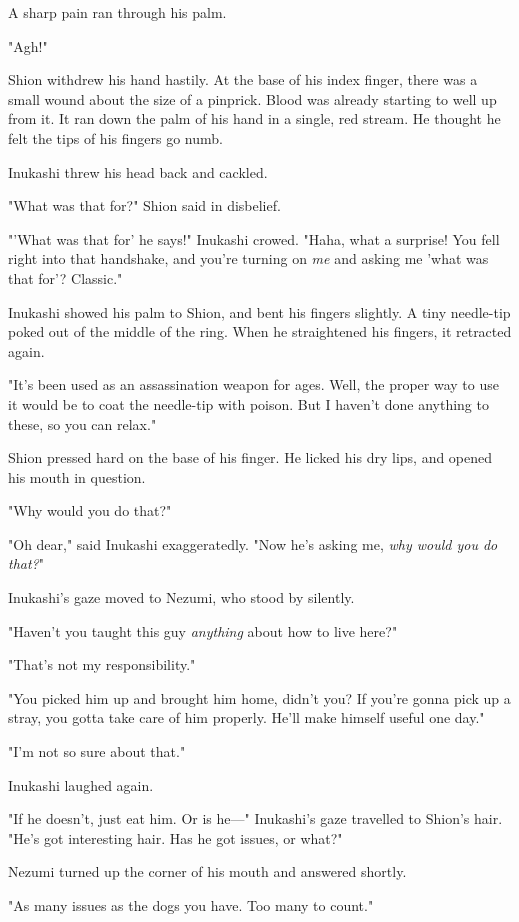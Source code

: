 A sharp pain ran through his palm.

"Agh!"

Shion withdrew his hand hastily. At the base of his index finger, there
was a small wound about the size of a pinprick. Blood was already
starting to well up from it. It ran down the palm of his hand in a
single, red stream. He thought he felt the tips of his fingers go numb.

Inukashi threw his head back and cackled.

"What was that for?" Shion said in disbelief.

"'What was that for' he says!" Inukashi crowed. "Haha, what a surprise!
You fell right into that handshake, and you're turning on \emph{me} and asking
me 'what was that for'? Classic."

Inukashi showed his palm to Shion, and bent his fingers slightly. A tiny
needle-tip poked out of the middle of the ring. When he straightened his
fingers, it retracted again.

"It's been used as an assassination weapon for ages. Well, the proper
way to use it would be to coat the needle-tip with poison. But I haven't
done anything to these, so you can relax."

Shion pressed hard on the base of his finger. He licked his dry lips,
and opened his mouth in question.

"Why would you do that?"

"Oh dear," said Inukashi exaggeratedly. "Now he's asking me, \emph{why would
you do that?}"

Inukashi's gaze moved to Nezumi, who stood by silently.

"Haven't you taught this guy \emph{anything} about how to live here?"

"That's not my responsibility."

"You picked him up and brought him home, didn't you? If you're gonna
pick up a stray, you gotta take care of him properly. He'll make himself
useful one day."

"I'm not so sure about that."

Inukashi laughed again.

"If he doesn't, just eat him. Or is he---" Inukashi's gaze travelled to
Shion's hair. "He's got interesting hair. Has he got issues, or what?"

Nezumi turned up the corner of his mouth and answered shortly.

"As many issues as the dogs you have. Too many to count."

